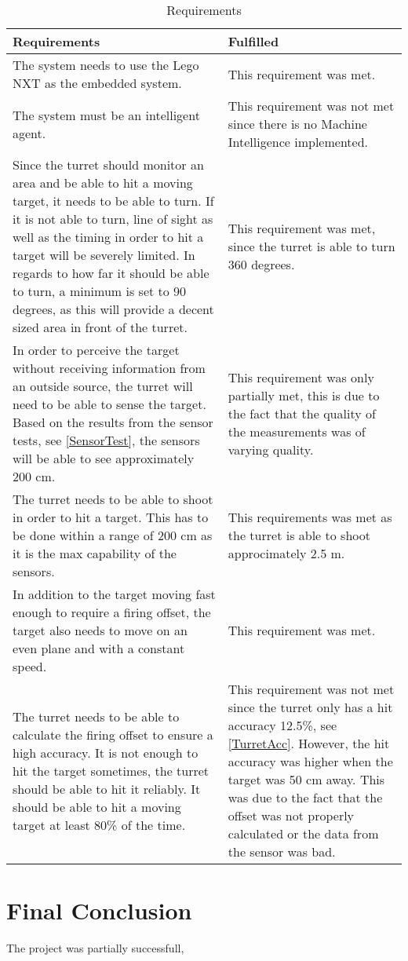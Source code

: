\begin{table}[H]
\centering
\begin{tabular}{|p{}|p{}|}
\hline
Requirements & Fulfilled\\ \hline
 The system needs to use the Lego NXT as the embedded system. & This
 requirement was met.\\
 \hline 
 The system must be an intelligent agent. & This requirement was not met
 since there is no Machine Intelligence implemented.\\ \hline
 Since the turret should monitor an area and be able to hit a moving target,
it needs to be able to turn. If it is not able to turn, line of sight as well
as the timing in order to hit a target will be severely limited. In regards
to how far it should be able to turn, a minimum is set to 90 degrees, as
this will provide a decent sized area in front of the turret. & This requirement
was met, since the turret is able to turn 360 degrees. \\ \hline
In order to perceive the target without receiving information from an
outside source, the turret will need to be able to sense the target. Based
on the results from the sensor tests, see \autoref{SensorTest}, the sensors will
be able to see approximately 200 cm. & This requirement was only partially met,
this is due to the fact that the quality of the measurements was of varying
quality. \\ \hline
 The turret needs to be able to shoot in order to hit a target. This has to
be done within a range of 200 cm as it is the max capability of the sensors. &
This requirements was met as the turret is able to shoot approcimately 2.5 m. \\
\hline
 In addition to the target moving fast enough to require a firing offset, the
target also needs to move on an even plane and with a constant speed. & This
requirement was met. \\ \hline
The turret needs to be able to calculate the firing offset to ensure a high
accuracy. It is not enough to hit the target sometimes, the turret should
be able to hit it reliably. It should be able to hit a moving target at least
80\% of the time. & This requirement was not met since the turret only has a hit
accuracy 12.5\%, see \autoref{TurretAcc}. However, the hit accuracy was higher
when the target was 50 cm away. This was due to the fact that the offset was not
properly calculated or the data from the sensor was bad. \\ \hline
\end{tabular}
\caption{Requirements}
\label{RequirementTable}
\end{table}
\section{Final Conclusion}
The project was partially successfull, 
